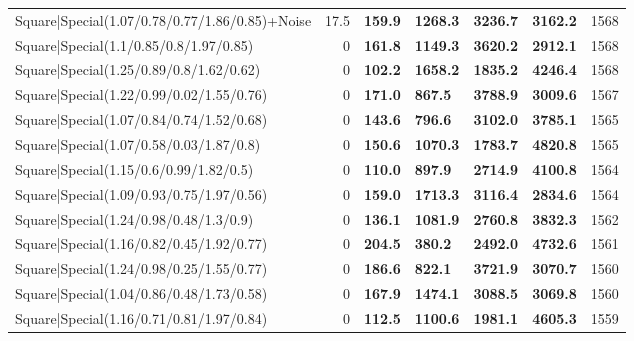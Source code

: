 \begin{tabular}{lrllllr}
 Square|Special(1.07/0.78/0.77/1.86/0.85)+Noise                &            17.5 & \textbf{159.9} & \textbf{1268.3} & \textbf{3236.7} & \textbf{3162.2} &         1568 \\
 Square|Special(1.1/0.85/0.8/1.97/0.85)                        &             0   & \textbf{161.8} & \textbf{1149.3} & \textbf{3620.2} & \textbf{2912.1} &         1568 \\
 Square|Special(1.25/0.89/0.8/1.62/0.62)                       &             0   & \textbf{102.2} & \textbf{1658.2} & \textbf{1835.2} & \textbf{4246.4} &         1568 \\
 Square|Special(1.22/0.99/0.02/1.55/0.76)                      &             0   & \textbf{171.0} & \textbf{867.5}  & \textbf{3788.9} & \textbf{3009.6} &         1567 \\
 Square|Special(1.07/0.84/0.74/1.52/0.68)                      &             0   & \textbf{143.6} & \textbf{796.6}  & \textbf{3102.0} & \textbf{3785.1} &         1565 \\
 Square|Special(1.07/0.58/0.03/1.87/0.8)                       &             0   & \textbf{150.6} & \textbf{1070.3} & \textbf{1783.7} & \textbf{4820.8} &         1565 \\
 Square|Special(1.15/0.6/0.99/1.82/0.5)                        &             0   & \textbf{110.0} & \textbf{897.9}  & \textbf{2714.9} & \textbf{4100.8} &         1564 \\
 Square|Special(1.09/0.93/0.75/1.97/0.56)                      &             0   & \textbf{159.0} & \textbf{1713.3} & \textbf{3116.4} & \textbf{2834.6} &         1564 \\
 Square|Special(1.24/0.98/0.48/1.3/0.9)                        &             0   & \textbf{136.1} & \textbf{1081.9} & \textbf{2760.8} & \textbf{3832.3} &         1562 \\
 Square|Special(1.16/0.82/0.45/1.92/0.77)                      &             0   & \textbf{204.5} & \textbf{380.2}  & \textbf{2492.0} & \textbf{4732.6} &         1561 \\
 Square|Special(1.24/0.98/0.25/1.55/0.77)                      &             0   & \textbf{186.6} & \textbf{822.1}  & \textbf{3721.9} & \textbf{3070.7} &         1560 \\
 Square|Special(1.04/0.86/0.48/1.73/0.58)                      &             0   & \textbf{167.9} & \textbf{1474.1} & \textbf{3088.5} & \textbf{3069.8} &         1560 \\
 Square|Special(1.16/0.71/0.81/1.97/0.84)                      &             0   & \textbf{112.5} & \textbf{1100.6} & \textbf{1981.1} & \textbf{4605.3} &         1559 \\

\end{tabular}
